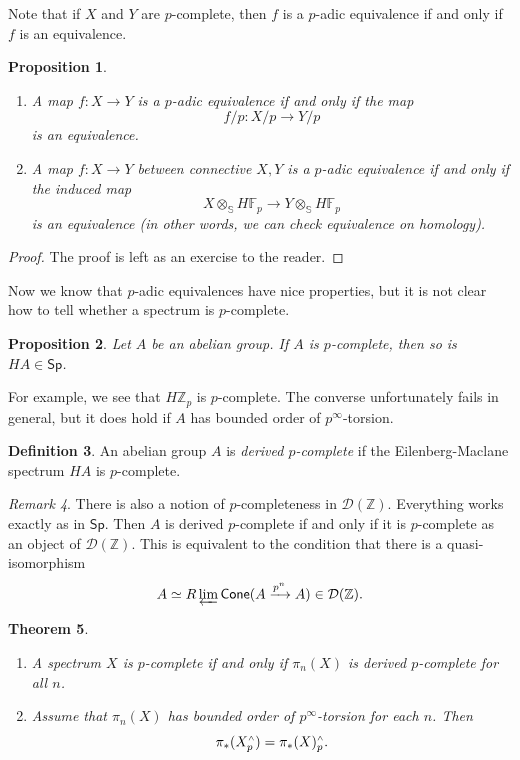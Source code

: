 \documentclass[10pt, oneside]{memoir}
\newtheorem{thm}{Theorem}[subsection]
\newtheorem{prop}[thm]{Proposition}
\theoremstyle{definition}
\newtheorem{defn}[thm]{Definition}
\theoremstyle{remark}
\newtheorem{rmk}[thm]{Remark}
\theoremstyle{plain}
\theoremstyle{definition}
\theoremstyle{remark}
\newcommand{\Z}{\mathbb{Z}}
\newcommand{\F}{\mathbb{F}}
\newcommand{\bS}{\mathbb{S}}
\newcommand{\mc}[1]{\mathcal{#1}}
\newcommand{\ms}[1]{\mathsf{#1}}
\newcommand{\1}{\mathbf{1}}
\newcommand{\2}{\mathbf{2}}
\newcommand{\3}{\mathbf{3}}
\newcommand{\sw}{\mathsmaller{\wedge}}
\begin{document}
Note that if \(X \) and \(Y \) are \(p \)-complete, then \(f \) is a \(p \)-adic equivalence if and only if \(f \) is an equivalence.

\begin{prop}\leavevmode
    \begin{enumerate}
        \item A map \(f \colon X \to Y \) is a \(p \)-adic equivalence if and only if the map
        \[ f/p \colon X/p \to Y/p \]
        is an equivalence.
        \item A map \(f \colon X \to Y \) between connective \(X, Y \) is a \(p \)-adic equivalence if and only if the induced map
        \[ X \otimes_{\bS} H\F_p \to Y \otimes_{\bS} H\F_p \]
        is an equivalence (in other words, we can check equivalence on homology).
    \end{enumerate}
\end{prop}

\begin{proof}
    The proof is left as an exercise to the reader.
\end{proof}

Now we know that \(p \)-adic equivalences have nice properties, but it is not clear how to tell whether a spectrum is \(p \)-complete.

\begin{prop}
    Let \(A \) be an abelian group. If \(A \) is \(p \)-complete, then so is \(HA \in \ms{Sp} \).
\end{prop}

For example, we see that \(H \Z_p \) is \(p \)-complete. The converse unfortunately fails in general, but it does hold if \(A \) has bounded order of \(p^{\infty} \)-torsion.

\begin{defn}
    An abelian group \(A \) is \textit{derived \(p \)-complete} if the Eilenberg-Maclane spectrum \(HA \) is \(p \)-complete.
\end{defn}

\begin{rmk}
    There is also a notion of \(p \)-completeness in \(\mc{D}(\Z) \). Everything works exactly as in \(\ms{Sp} \). Then \(A \) is derived \(p \)-complete if and only if it is \(p \)-complete as an object of \(\mc{D}(\Z) \). This is equivalent to the condition that there is a quasi-isomorphism
    \[ A \simeq R\varprojlim \ms{Cone}(A \xrightarrow{p^n} A) \in \mc{D}(\Z). \]
\end{rmk}

\begin{thm}\leavevmode
    \begin{enumerate}
        \item A spectrum \(X \) is \(p \)-complete if and only if \(\pi_n (X) \) is derived \(p \)-complete for all \(n \).
        \item Assume that \(\pi_n(X) \) has bounded order of \(p^{\infty} \)-torsion for each \(n \). Then
        \[ \pi_* (X_p^{\sw}) = \pi_*(X)_p^{\sw}. \]
    \end{enumerate}
\end{thm}
\end{document}
